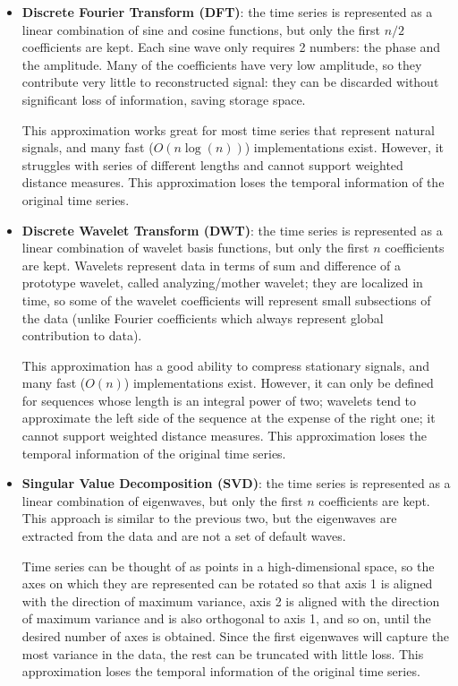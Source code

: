 \begin{itemize}
    \item \textbf{Discrete Fourier Transform (DFT)}: the time series is represented as a linear combination of sine and cosine functions, but only the first $n/2$ coefficients are kept. Each sine wave only requires 2 numbers: the phase and the amplitude. Many of the coefficients have very low amplitude, so they contribute very little to reconstructed signal: they can be discarded without significant loss of information, saving storage space.

    This approximation works great for most time series that represent natural signals, and many fast ($O(n \log(n))$) implementations exist. However, it struggles with series of different lengths and cannot support weighted distance measures. This approximation loses the temporal information of the original time series.

    \item \textbf{Discrete Wavelet Transform (DWT)}: the time series is represented as a linear combination of wavelet basis functions, but only the first $n$ coefficients are kept. Wavelets represent data in terms of sum and difference of a prototype wavelet, called analyzing/mother wavelet; they are localized in time, so some of the wavelet coefficients will represent small subsections of the data (unlike Fourier coefficients which always represent global contribution to data).

    This approximation has a good ability to compress stationary signals, and many fast ($O(n)$) implementations exist. However, it can only be defined for sequences whose length is an integral power of two; wavelets tend to approximate the left side of the sequence at the expense of the right one; it cannot support weighted distance measures. This approximation loses the temporal information of the original time series.

    \item \textbf{Singular Value Decomposition (SVD)}: the time series is represented as a linear combination of eigenwaves, but only the first $n$ coefficients are kept. This approach is similar to the previous two, but the eigenwaves are extracted from the data and are not a set of default waves.
    
    Time series can be thought of as points in a high-dimensional space, so the axes on which they are represented can be rotated so that axis 1 is aligned with the direction of maximum variance, axis 2 is aligned with the direction of maximum variance and is also orthogonal to axis 1, and so on, until the desired number of axes is obtained. Since the first eigenwaves will capture the most variance in the data, the rest can be truncated with little loss. This approximation loses the temporal information of the original time series.


\end{itemize}
